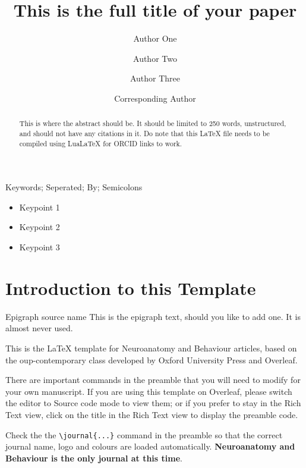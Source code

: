 \documentclass[a4paper,num-refs]{ehi-journals}
\title{This is the full title of your paper}
\author[1,\authfn{2}]{Author One\orcid{0000-0000-0000-0000}}
\author[1,2,\authfn{2}]{Author Two}
\author[1,2]{Author Three}
\author[1,\authfn{1}]{Corresponding Author}
\affil[1]{Affiliation 1}
\affil[2]{Affiliation 2}
\begin{document}
\begin{frontmatter}
\maketitle
\begin{abstract}
This is where the abstract should be. It should be limited to 250 words, unstructured, and should not have any citations in it. Do note that this LaTeX file needs to be compiled using LuaLaTeX for ORCID links to work. 
\end{abstract}

\begin{keywords}
Keywords; Seperated; By; Semicolons
\end{keywords}
\end{frontmatter}

\begin{keypoints*}
\begin{itemize}
\item Keypoint 1
\item Keypoint 2
\item Keypoint 3
\end{itemize}
\end{keypoints*}

\section{Introduction to this Template}

\begin{epigraph}{Epigraph source name}
This is the epigraph text, should you like to add one. It is almost never used. 
\end{epigraph}

This is the \LaTeX{} template for Neuroanatomy and Behaviour articles, based on the oup-contemporary class developed by Oxford University Press and Overleaf. 

There are important commands in the preamble that you will need to modify for your own manuscript. If you are using this template on Overleaf, please switch the editor to Source code mode to view them; or if you prefer to stay in the Rich Text view, click on the title in the Rich Text view to display the preamble code.

Check the the \verb|\journal{...}| command in the preamble so that the correct journal name, logo and colours are loaded automatically. \textbf{Neuroanatomy and Behaviour is the only journal at this time}.
\end{document}
